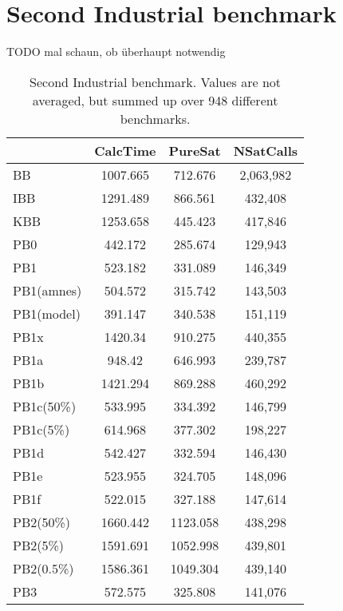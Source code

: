 \section{Second Industrial benchmark}

TODO mal schaun, ob überhaupt notwendig

\begin{wraptable}{R}{8cm}
\begin{tabular}{l| c c c }

 & CalcTime & PureSat & NSatCalls \\
 \hline
BB & 1007.665 & 712.676 & 2,063,982 \\
IBB & 1291.489 & 866.561 & 432,408 \\
KBB & 1253.658 & 445.423 & 417,846 \\
PB0 & 442.172 & 285.674 & 129,943 \\
PB1 & 523.182 & 331.089 & 146,349 \\
PB1(amnes) & 504.572 & 315.742 & 143,503 \\
PB1(model) & 391.147 & 340.538 & 151,119 \\
PB1x & 1420.34 & 910.275 & 440,355 \\
PB1a & 948.42 & 646.993 & 239,787 \\
PB1b & 1421.294 & 869.288 & 460,292 \\
PB1c(50\%) & 533.995 & 334.392 & 146,799 \\
PB1c(5\%) & 614.968 & 377.302 & 198,227 \\
PB1d & 542.427 & 332.594 & 146,430 \\
PB1e & 523.955 & 324.705 & 148,096 \\
PB1f & 522.015 & 327.188 & 147,614 \\
PB2(50\%) & 1660.442 & 1123.058 & 438,298 \\
PB2(5\%) & 1591.691 & 1052.998 & 439,801 \\
PB2(0.5\%) & 1586.361 & 1049.304 & 439,140 \\
PB3 & 572.575 & 325.808 & 141,076 \\

\end{tabular}
\caption{Second Industrial benchmark. Values are not averaged, but summed up over 948 different benchmarks.}
\label{tab:vonThore2pof} %
\end{wraptable}